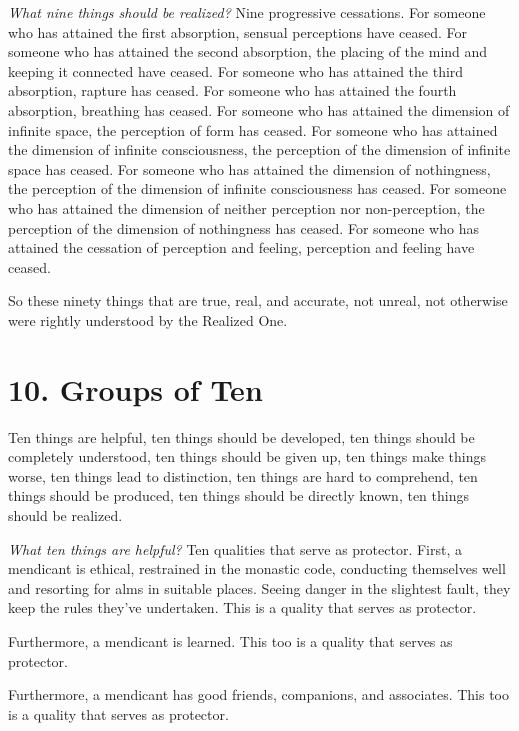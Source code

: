 \documentclass[12pt,openany]{book}%
\begin{document}
\emph{What nine things should be realized?} Nine progressive cessations. For someone who has attained the first absorption, sensual perceptions have ceased. For someone who has attained the second absorption, the placing of the mind and keeping it connected have ceased. For someone who has attained the third absorption, rapture has ceased. For someone who has attained the fourth absorption, breathing has ceased. For someone who has attained the dimension of infinite space, the perception of form has ceased. For someone who has attained the dimension of infinite consciousness, the perception of the dimension of infinite space has ceased. For someone who has attained the dimension of nothingness, the perception of the dimension of infinite consciousness has ceased. For someone who has attained the dimension of neither perception nor non-perception, the perception of the dimension of nothingness has ceased. For someone who has attained the cessation of perception and feeling, perception and feeling have ceased. 

So these ninety things that are true, real, and accurate, not unreal, not otherwise were rightly understood by the Realized One. 

\section*{10. Groups of Ten }

Ten things are helpful, ten things should be developed, ten things should be completely understood, ten things should be given up, ten things make things worse, ten things lead to distinction, ten things are hard to comprehend, ten things should be produced, ten things should be directly known, ten things should be realized. 

\emph{What ten things are helpful?} Ten qualities that serve as protector. First, a mendicant is ethical, restrained in the monastic code, conducting themselves well and resorting for alms in suitable places. Seeing danger in the slightest fault, they keep the rules they’ve undertaken. This is a quality that serves as protector. 

Furthermore, a mendicant is learned. This too is a quality that serves as protector. 

Furthermore, a mendicant has good friends, companions, and associates. This too is a quality that serves as protector. 
\end{document}
